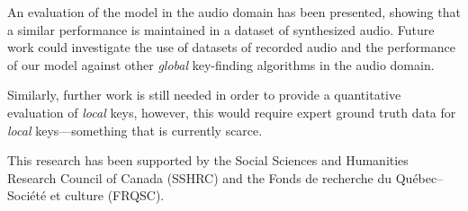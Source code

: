 \documentclass[sigconf]{acmart}
\begin{document}
An evaluation of the model in the audio domain has been presented, showing that a similar performance is maintained in a dataset of synthesized audio. Future work could investigate the use of datasets of recorded audio and the performance of our model against other \emph{global} key-finding algorithms in the audio domain. 

Similarly, further work is still needed in order to provide a quantitative evaluation of \emph{local} keys, however, this would require expert ground truth data for \emph{local} keys---something that is currently scarce.

\begin{acks}
This research has been supported by the Social Sciences and Humanities Research Council of Canada (SSHRC) and the Fonds de recherche du Qu\'ebec--Soci\'et\'e et culture (FRQSC).
\end{acks}




\end{document}
